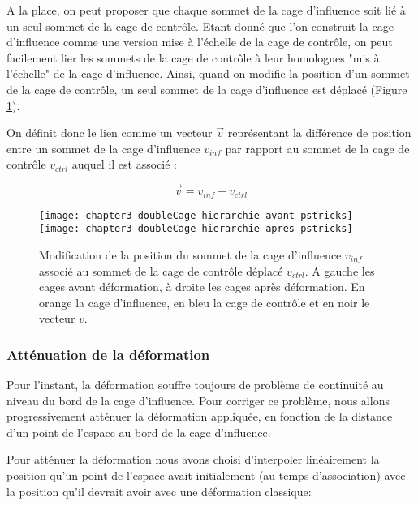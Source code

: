 A la place, on peut proposer que chaque sommet de la cage d'influence soit lié à
un seul sommet de la cage de contrôle. Etant donné que l'on construit la cage
d'influence comme une version mise à l'échelle de la cage de contrôle, on peut
facilement lier les sommets de la cage de contrôle à leur homologues "mis à
l'échelle" de la cage d'influence. Ainsi, quand on modifie la position d'un
sommet de la cage de contrôle, un seul sommet de la cage d'influence est
déplacé (Figure \ref{MelHie}).

On définit donc le lien comme un vecteur $\overrightarrow{v}$ représentant la
différence de position entre un sommet de la cage d'influence $v_{inf}$ par
rapport au sommet de la cage de contrôle $v_{ctrl}$ auquel il est associé :

\begin{displaymath}
  \overrightarrow{v} = v_{inf}-v_{ctrl}
\end{displaymath}

\begin{figure}[ht]
\begin{center}
  \texttt{[image: chapter3-doubleCage-hierarchie-avant-pstricks]}
  \texttt{[image: chapter3-doubleCage-hierarchie-apres-pstricks]}

  \caption[Association des cages de contrôle et d'influence] {Modification de
la position du sommet de la cage d'influence $v_{inf}$ associé au sommet de la
cage de contrôle déplacé $v_{ctrl}$. A gauche les cages avant déformation, à
droite les cages après déformation. En orange la cage d'influence, en bleu la
cage de contrôle et en noir le vecteur $v$.}

  \label{MelHie}
\end{center}
\end{figure}

\subsubsection{Atténuation de la déformation}

Pour l'instant, la déformation souffre toujours de problème de continuité au
niveau du bord de la cage d'influence. Pour corriger ce problème, nous allons
progressivement atténuer la déformation appliquée, en fonction de la distance
d'un point de l'espace au bord de la cage d'influence.

Pour atténuer la déformation nous avons choisi d'interpoler linéairement la
position qu'un point de l'espace avait initialement (au temps d'association)
avec la position qu'il devrait avoir avec une déformation classique:

